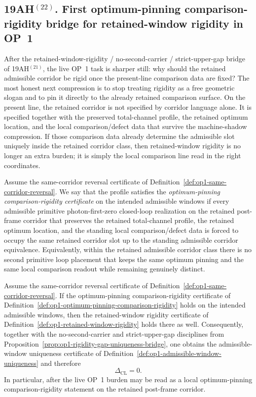\subsection*{19AH$^{(22)}$. First optimum-pinning comparison-rigidity bridge for retained-window rigidity in OP~1}
After the retained-window-rigidity / no-second-carrier / strict-upper-gap bridge of 19AH$^{(21)}$, the live OP~1 task is sharper still: why should the retained admissible corridor be rigid once the present-line comparison data are fixed? The most honest next compression is to stop treating rigidity as a free geometric slogan and to pin it directly to the already retained comparison surface. On the present line, the retained corridor is not specified by corridor language alone. It is specified together with the preserved total-channel profile, the retained optimum location, and the local comparison/defect data that survive the machine-shadow compression. If those comparison data already determine the admissible slot uniquely inside the retained corridor class, then retained-window rigidity is no longer an extra burden; it is simply the local comparison line read in the right coordinates.

\begin{definition}
\label{def:op1-optimum-pinning-comparison-rigidity}
Assume the same-corridor reversal certificate of Definition~\ref{def:op1-same-corridor-reversal}. We say that the profile satisfies the \emph{optimum-pinning comparison-rigidity certificate} on the intended admissible windows if every admissible primitive photon-first-zero closed-loop realization on the retained post-frame corridor that preserves the retained total-channel profile, the retained optimum location, and the standing local comparison/defect data is forced to occupy the same retained corridor slot up to the standing admissible corridor equivalence. Equivalently, within the retained admissible corridor class there is no second primitive loop placement that keeps the same optimum pinning and the same local comparison readout while remaining genuinely distinct.
\end{definition}

\begin{proposition}
\label{prop:op1-optimum-pinning-implies-rigidity}
Assume the same-corridor reversal certificate of Definition~\ref{def:op1-same-corridor-reversal}. If the optimum-pinning comparison-rigidity certificate of Definition~\ref{def:op1-optimum-pinning-comparison-rigidity} holds on the intended admissible windows, then the retained-window rigidity certificate of Definition~\ref{def:op1-retained-window-rigidity} holds there as well. Consequently, together with the no-second-carrier and strict-upper-gap disciplines from Proposition~\ref{prop:op1-rigidity-gap-uniqueness-bridge}, one obtains the admissible-window uniqueness certificate of Definition~\ref{def:op1-admissible-window-uniqueness} and therefore
\[
 \Delta_{\mathrm{CL}} = 0.
\]
In particular, after the live OP~1 burden may be read as a local optimum-pinning comparison-rigidity statement on the retained post-frame corridor.
\end{proposition}

